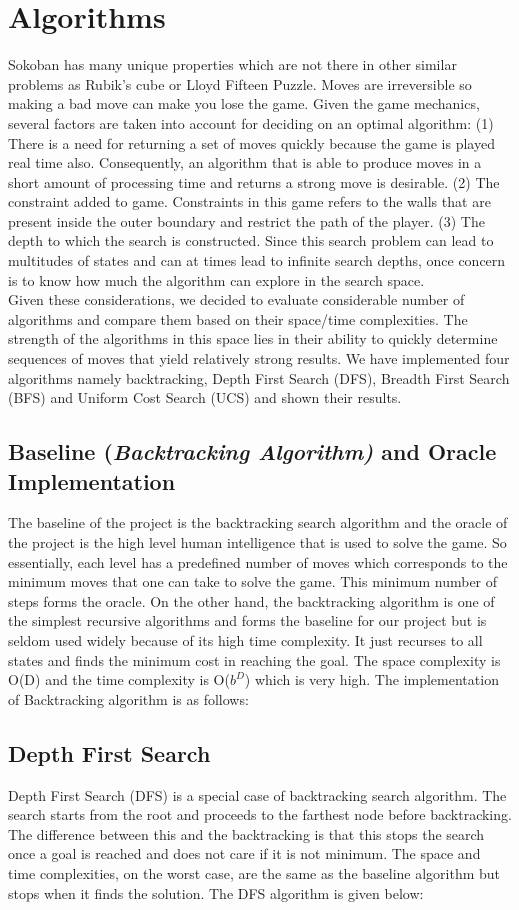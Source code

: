 \documentclass[10pt, final]{article}
\newcommand{\br}[1][.75]{\ \\[#1\baselineskip]}
\begin{document}
	\section{Algorithms}
	Sokoban has many unique properties which are not there in other similar problems as Rubik’s cube or Lloyd Fifteen Puzzle. Moves are irreversible so making a bad move can make you lose the game. Given the game mechanics, several factors are taken into account for deciding on an optimal algorithm:
	(1) There is a need for returning a set of moves quickly because the game is played real time also. Consequently, an algorithm that is able to produce moves in a short amount of processing time and returns a strong move is desirable.
	(2) The constraint added to game. Constraints in this game refers to the walls that are present inside the outer boundary and restrict the path of the player.
	(3) The depth to which the search is constructed. Since this search problem can lead to multitudes of states and can at times lead to infinite search depths, once concern is to know how much the algorithm can explore in the search space. \br
	Given these considerations, we decided to evaluate considerable number of algorithms and compare them based on their space/time complexities. The strength of the algorithms in this space lies in their ability to quickly determine sequences of moves that yield relatively strong results. We have implemented four algorithms namely backtracking, Depth First Search (DFS), Breadth First Search (BFS) and Uniform Cost Search (UCS) and shown their results.
	\subsection{Baseline (\textit{Backtracking Algorithm)} and Oracle Implementation}
	The baseline of the project is the backtracking search algorithm and the oracle of the project is the high level human intelligence that is used to solve the game. So essentially, each level has a predefined number of moves which corresponds to the minimum moves that one can take to solve the game. This minimum number of steps forms the oracle. On the other hand, the backtracking algorithm is one of the simplest recursive algorithms and forms the baseline for our project but is seldom used widely because of its high time complexity. It just recurses to all states and finds the minimum cost in reaching the goal. The space complexity is O(D) and the time complexity is O($b^D$) which is very high. The implementation of Backtracking algorithm is as follows:
	\subsection{Depth First Search}
	Depth First Search (DFS) is a special case of backtracking search algorithm. The search starts from the root and proceeds to the farthest node before backtracking. The difference between this and the backtracking is that this stops the search once a goal is reached and does not care if it is not minimum. The space and time complexities, on the worst case, are the same as the baseline algorithm but stops when it finds the solution. The DFS algorithm is given below:
\end{document}
